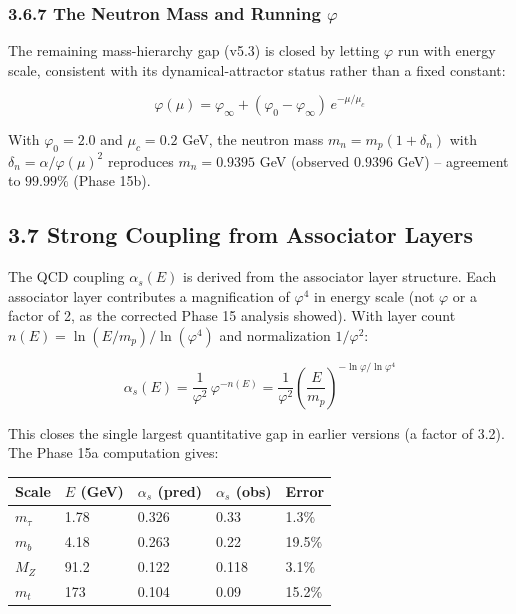 \documentclass[
  11pt,
]{article}
\begin{document}
\subsubsection{\texorpdfstring{3.6.7 The Neutron Mass and Running
\(\varphi\)}{3.6.7 The Neutron Mass and Running \textbackslash varphi}}\label{the-neutron-mass-and-running-varphi}

The remaining mass-hierarchy gap (v5.3) is closed by letting \(\varphi\)
run with energy scale, consistent with its dynamical-attractor status
rather than a fixed constant:

\[\varphi(\mu) = \varphi_\infty + (\varphi_0 - \varphi_\infty)\,e^{-\mu/\mu_c}\]

With \(\varphi_0 = 2.0\) and \(\mu_c = 0.2\) GeV, the neutron mass
\(m_n = m_p(1+\delta_n)\) with \(\delta_n = \alpha/\varphi(\mu)^2\)
reproduces \(m_n = 0.9395\) GeV (observed \(0.9396\) GeV) -- agreement
to \(99.99\%\) (Phase 15b).

\subsection{3.7 Strong Coupling from Associator
Layers}\label{strong-coupling-from-associator-layers}

The QCD coupling \(\alpha_s(E)\) is derived from the associator layer
structure. Each associator layer contributes a magnification of
\(\varphi^4\) in energy scale (not \(\varphi\) or a factor of 2, as the
corrected Phase 15 analysis showed). With layer count
\(n(E) = \ln(E/m_p)/\ln(\varphi^4)\) and normalization \(1/\varphi^2\):

\[\alpha_s(E) = \frac{1}{\varphi^2}\,\varphi^{-n(E)} = \frac{1}{\varphi^2}\left(\frac{E}{m_p}\right)^{-\ln\varphi/\ln\varphi^4}\]

This closes the single largest quantitative gap in earlier versions (a
factor of 3.2). The Phase 15a computation gives:

\begin{longtable}[]{@{}lllll@{}}
\toprule\noalign{}
Scale & \(E\) (GeV) & \(\alpha_s\) (pred) & \(\alpha_s\) (obs) &
Error \\
\midrule\noalign{}
\endhead
\bottomrule\noalign{}
\endlastfoot
\(m_\tau\) & 1.78 & 0.326 & 0.33 & 1.3\% \\
\(m_b\) & 4.18 & 0.263 & 0.22 & 19.5\% \\
\(M_Z\) & 91.2 & 0.122 & 0.118 & 3.1\% \\
\(m_t\) & 173 & 0.104 & 0.09 & 15.2\% \\
\end{longtable}
\end{document}
